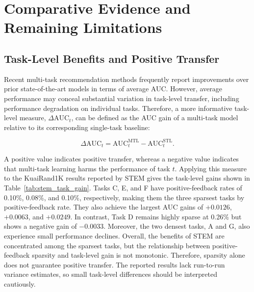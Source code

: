 \section{Comparative Evidence and Remaining Limitations}

\subsection{Task-Level Benefits and Positive Transfer}
Recent multi-task recommendation methods frequently report improvements over prior state-of-the-art models in terms of average AUC. However, average performance may conceal substantial variation in task-level transfer, including performance degradation on individual tasks. Therefore, a more informative task-level measure, $\Delta \mathrm{AUC}_t$, can be defined as the AUC gain of a multi-task model relative to its corresponding single-task baseline:

\begin{equation}
\Delta \mathrm{AUC}_t
=
\mathrm{AUC}_t^{\mathrm{MTL}}
-
\mathrm{AUC}_t^{\mathrm{STL}}.
\end{equation}

A positive value indicates positive transfer, whereas a negative value indicates that multi-task learning harms the performance of task $t$. Applying this measure to the KuaiRand1K results reported by STEM \citep{Su2024STEM} gives the task-level gains shown in Table~\ref{tab:stem_task_gain}. Tasks C, E, and F have positive-feedback rates of 0.10\%, 0.08\%, and 0.10\%, respectively, making them the three sparsest tasks by positive-feedback rate. They also achieve the largest AUC gains of $+0.0126$, $+0.0063$, and $+0.0249$. In contrast, Task D remains highly sparse at 0.26\% but shows a negative gain of $-0.0033$. Moreover, the two densest tasks, A and G, also experience small performance declines. Overall, the benefits of STEM are concentrated among the sparsest tasks, but the relationship between positive-feedback sparsity and task-level gain is not monotonic. Therefore, sparsity alone does not guarantee positive transfer. The reported results lack run-to-run variance estimates, so small task-level differences should be interpreted cautiously.

